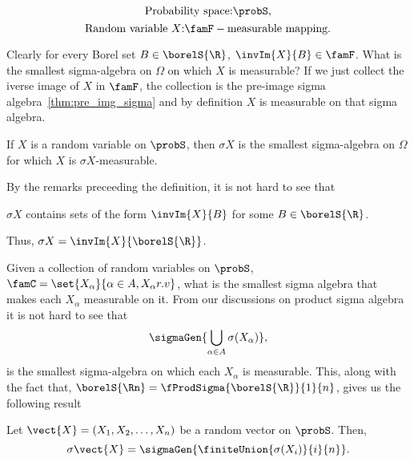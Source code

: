 \[\text{Probability space:} \probS,\]
\[\text{Random variable $X$:}\famF-\text{measurable mapping}.\]

Clearly for every Borel set $B \in \borelS{\R}$, $\invIm{X}{B} \in \famF$. What is the smallest sigma-algebra
on $\Omega$ on which $X$ is measurable? If we just collect the iverse image of $X$ in $\famF$, the collection
is the pre-image sigma algebra~\ref{thm:pre_img_sigma} and by definition $X$ is measurable on that sigma
algebra. 

\begin{Definition}
    If $X$ is a random variable on $\probS$, then $\sigma{X}$ is the smallest 
    sigma-algebra on $\Omega$ for which $X$
    is $\sigma{X}$-measurable.
\end{Definition}
By the remarks preceeding the definition, it is not hard to see that
\begin{Proposition}
    $\sigma{X}$ contains sets of the form $\invIm{X}{B}$ for some $B \in \borelS{\R}$. 
\end{Proposition}
Thus, $\sigma{X} = \invIm{X}{\borelS{\R}}$.
\begin{Remark}
Given a collection of random variables on $\probS$, $\famC=\set{X_{\alpha}}{\alpha \in A, X_{\alpha} r.v}$,
what is the smallest sigma algebra that makes each $X_{\alpha}$ measurable on it. From our discussions on
product sigma algebra it is not hard to see that
\[\sigmaGen{\bigcup\limits_{\alpha \in A}\sigma(X_\alpha)},\]
is the smallest sigma-algebra on which each $X_{\alpha}$ is measurable. This, along with the fact that,
$\borelS{\Rn} = \fProdSigma{\borelS{\R}}{1}{n}$, gives us the following result
\end{Remark}
\begin{Proposition}
    Let $\vect{X} = (X_1,X_2,\dots,X_n)$ be a random vector on $\probS$. Then,
    \[\sigma{\vect{X}} = \sigmaGen{\finiteUnion{\sigma(X_i)}{i}{n}}.\]
\end{Proposition}



